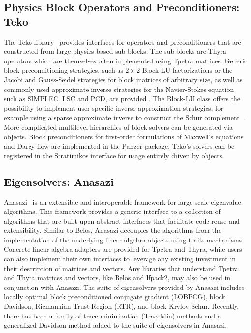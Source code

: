\subsection{Physics Block Operators and Preconditioners: Teko}
\label{sec:teko}

The Teko library~\cite{Cyr2016a} provides interfaces for operators and preconditioners that are constructed from large physics-based sub-blocks.
The sub-blocks are Thyra operators which are themselves often implemented using Tpetra matrices.
Generic block preconditioning strategies, such as $2\times2$ Block-LU factorizations or the Jacobi and Gauss-Seidel strategies for block matrices of arbitrary size,
as well as commonly used approximate inverse strategies for the Navier-Stokes equation
such as SIMPLEC, LSC and PCD, are provided \cite{CyrShadidEtAl2012_StabilizationScalableBlockPreconditioning}.
The Block-LU class offers the possibility to implement user-specific inverse approximation strategies,
for example using a sparse approximate inverse to construct the Schur complement~\cite{Firmbach2024a}.
More complicated multilevel hierarchies of block solvers can be generated via  objects.
Block preconditioners for first-order formulations of Maxwell's equations and Darcy flow are implemented in the Panzer package.
Teko's solvers can be registered in the Stratimikos interface for usage entirely driven by  objects.

\subsection{Eigensolvers: Anasazi}
Anasazi~\cite{Baker2009a} is an extensible and interoperable framework for large-scale eigenvalue algorithms.
This framework provides a generic interface to a collection of algorithms that are built upon abstract interfaces
that facilitate code reuse and extensibility.  Similar to Belos, Anasazi decouples the algorithms from the
implementation of the underlying linear algebra objects using traits mechanisms.  Concrete linear algebra adapters
are provided for Tpetra and Thyra, while users can also implement their own interfaces to leverage any existing
investment in their description of matrices and vectors.  Any libraries that understand Tpetra and Thyra matrices
and vectors, like Belos and Ifpack2, may also be used in conjunction with Anasazi.  The suite of eigensolvers provided
by Anasazi includes locally optimal block preconditioned conjugate gradient (LOBPCG), block Davidson, Riemannian Trust-Region
(RTR), and block Krylov-Schur.  Recently, there has been a family of trace minimization (TraceMin) methods and a
generalized Davidson method added to the suite of eigensolvers in Anasazi.


